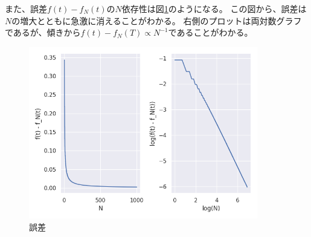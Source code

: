 \documentclass{jsarticle}
\begin{document}
また、誤差$f(t) - f_N(t)$の$N$依存性は図\ref{f4}のようになる。
この図から、誤差は$N$の増大とともに急激に消えることがわかる。
右側のプロットは両対数グラフであるが、傾きから$f(t) - f_N(T) \propto N^{-1}$であることがわかる。
\begin{figure}[htbp]
    \includegraphics[clip,width=10.0cm]{./fourier_error_case2.png}
    \caption{誤差}
    \label{f4}
\end{figure}
\end{document}
